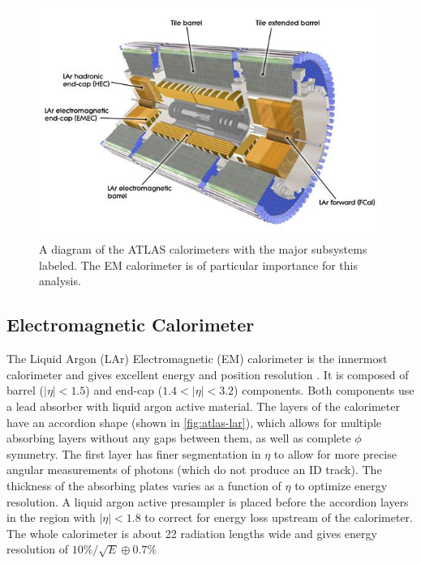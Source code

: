 \begin{figure}[!h]
\centering
\includegraphics[width=.8\textwidth]{figures/Detector/atlas-calorimeters.jpg}
\caption{A diagram of the \ac{ATLAS} calorimeters with the major subsystems labeled. The \ac{EM} calorimeter is of particular importance for this analysis. \cite{calorimeters}}
\label{fig:atlas-calos}
\end{figure}


\subsection{Electromagnetic Calorimeter}

The Liquid Argon (LAr) Electromagnetic (EM) calorimeter is the innermost calorimeter and gives excellent energy and position resolution \cite{calorimeters}. It is composed of barrel ($|\eta| < 1.5$) and end-cap ($1.4 < |\eta| < 3.2$) components. Both components use a lead absorber with liquid argon active material. The layers of the calorimeter have an accordion shape (shown in \autoref{fig:atlas-lar}), which allows for multiple absorbing layers without any gaps between them, as well as complete $\phi$ symmetry. The first layer has finer segmentation in $\eta$ to allow for more precise angular measurements of photons (which do not produce an \ac{ID} track). The thickness of the absorbing plates varies as a function of $\eta$ to optimize energy resolution. A liquid argon active presampler is placed before the accordion layers in the region with $|\eta| < 1.8$ to correct for energy loss upstream of the calorimeter. The whole calorimeter is about 22 radiation lengths wide and gives energy resolution of $10\%/\sqrt{E} \oplus 0.7\%$

